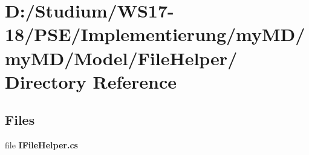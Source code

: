 \hypertarget{dir_D_3A_2FStudium_2FWS17_2D18_2FPSE_2FImplementierung_2FmyMD_2FmyMD_2FModel_2FFileHelper_2F}{
\section{D:/Studium/WS17-18/PSE/Implementierung/my\-MD/my\-MD/Model/File\-Helper/ Directory Reference}
\label{dir_D_3A_2FStudium_2FWS17_2D18_2FPSE_2FImplementierung_2FmyMD_2FmyMD_2FModel_2FFileHelper_2F}
}


\subsection*{Files}
\begin{CompactItemize}
\item 
file {\bf IFile\-Helper.cs}
\end{CompactItemize}
